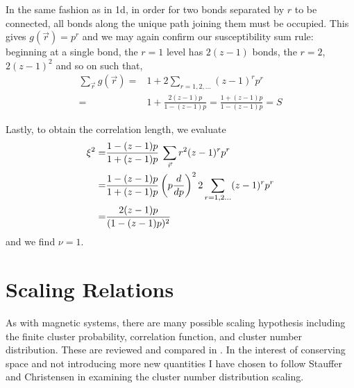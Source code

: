 In the same fashion as in 1d, in order
for two bonds separated by $r$ to be connected, all bonds along the unique path
joining them must be occupied.  This gives $g(\vec{r}) = p^r$ and we may again
confirm our susceptibility sum rule: beginning at a single
bond, the $r=1$ level has $2(z-1)$ bonds, the $r=2$, $2(z-1)^2$ and so on such that,
\begin{align*}
\sum_{\vec{r}}g(\vec{r}) =& 1 + 2 \sum_{r=1,2,...} (z-1)^r p^r \\
=& 1 + \frac{2(z-1)p}{1 - (z-1)p} = \frac{1 + (z-1)p}{1 - (z-1)p} = S
\end{align*}

Lastly, to obtain the correlation length, we evaluate
\begin{align*}
\xi^2 =& \frac{1-(z-1)p}{1+(z-1)p}\:\sum_{\vec{r}}r^2(z-1)^rp^r \\
=& \frac{1-(z-1)p}{1+(z-1)p}\left(p\frac{d }{d p}\right)^2 2\sum_{r=1,2...}(z-1)^rp^r \\
=& \frac{2(z-1)p}{(1-(z-1)p)^2}
\end{align*}
and we find $\nu = 1$.


\section{Scaling Relations}

As with magnetic systems, there are many
possible scaling hypothesis including the finite cluster probability, correlation
function, and cluster number distribution.  These are reviewed and compared in
\cite{Essam1980}. In the interest of conserving space and not introducing
more new quantities I have chosen to follow Stauffer and Christensen in examining
the cluster number distribution scaling.


